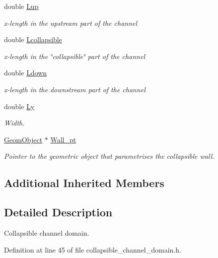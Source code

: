\begin{DoxyCompactItemize}
double \hyperlink{classoomph_1_1CollapsibleChannelDomain_a1c4dbe3313e696290ad9da4765d0a0e1}{Lup}
\begin{DoxyCompactList}\small\item\em x-\/length in the upstream part of the channel \end{DoxyCompactList}\item 
double \hyperlink{classoomph_1_1CollapsibleChannelDomain_aa44cd6613cea2a67dda8f4de0d9c6f1e}{Lcollapsible}
\begin{DoxyCompactList}\small\item\em x-\/length in the \char`\"{}collapsible\char`\"{} part of the channel \end{DoxyCompactList}\item 
double \hyperlink{classoomph_1_1CollapsibleChannelDomain_ade4ee8220972fe6c454211d1f837fcf9}{Ldown}
\begin{DoxyCompactList}\small\item\em x-\/length in the downstream part of the channel \end{DoxyCompactList}\item 
double \hyperlink{classoomph_1_1CollapsibleChannelDomain_ac70912e194ac3e211cc0ce625c8f5c41}{Ly}
\begin{DoxyCompactList}\small\item\em Width. \end{DoxyCompactList}\item 
\hyperlink{classoomph_1_1GeomObject}{Geom\+Object} $\ast$ \hyperlink{classoomph_1_1CollapsibleChannelDomain_a6f1ef65c47937800e35477863b1439ab}{Wall\+\_\+pt}
\begin{DoxyCompactList}\small\item\em Pointer to the geometric object that parametrises the collapsible wall. \end{DoxyCompactList}\end{DoxyCompactItemize}
\subsection*{Additional Inherited Members}


\subsection{Detailed Description}
Collapsible channel domain. 

Definition at line 45 of file collapsible\+\_\+channel\+\_\+domain.\+h.



